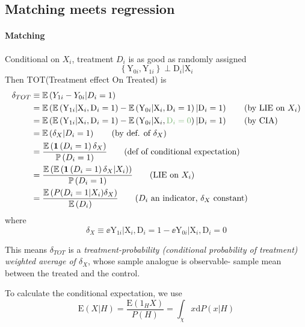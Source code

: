 \documentclass[11pt]{article}
\begin{document}
\subsection{Matching meets regression}
\paragraph*{Matching}
Conditional on $X_i$, treatment $D_i$ is as good as randomly assigned
\begin{equation}
   \left\{\mathrm{Y}_{0 i}, \mathrm{Y}_{1 i}\right\} \perp \mathrm{D}_{i} | \mathrm{X}_{i}
\end{equation}
Then TOT(Treatment effect On Treated) is
\begin{align*}
    \delta_{TOT}
    &\equiv \ee{Y_{1i}-Y_{0i}|D_i=1}\\
    &=\ee{\ee{\mathrm{Y}_{1 i} | \mathrm{X}_{i}, \mathrm{D}_{i}=1}-\ee{\mathrm{Y}_{0 i} | \mathrm{X}_{i}, \mathrm{D}_{i}=1} | \mathrm{D}_{i}=1}\tag{by LIE on $X_i$}\\
    &=\ee{\ee{\mathrm{Y}_{1 i} | \mathrm{X}_{i}, \mathrm{D}_{i}=1}-\ee{\mathrm{Y}_{0 i} | \mathrm{X}_{i}, \tcg{\mathrm{D}_{i}=0}} | \mathrm{D}_{i}=1}\tag{by CIA}\\
    &=\ee{\delta_X|D_i=1}\tag{by def. of $\delta_X$} \\
    &= \frac{\ee{\ind{D_i=1} \delta_X}}{\pp{D_i=1}} \tag{def of conditional expectation} \\
    &= \frac{\ee{\ee{\ind{D_i=1} \delta_X | X_i}}}{\pp{D_i=1}} \tag{LIE on $X_i$} \\ 
    &=\frac{\ee{P(D_i=1|X_i)\delta_X}}{\ee{D_i}} \tag{$D_i$ an indicator, $\delta_X$ constant}
\end{align*}
where 
$$
\delta_X\equiv\ee{\mathrm{Y}_{1i} | \mathrm{X}_{i}, \mathrm{D}_{i}=1}-\ee{\mathrm{Y}_{0i} | \mathrm{X}_{i}, \mathrm{D}_{i}=0}
$$
\begin{interpretation}
This means $\delta_{TOT}$ is a \emph{treatment-probability (conditional probability of treatment) weighted average of $\delta_X$}, whose sample analogue is observable- sample mean between the treated and the control.
\end{interpretation}

\begin{remark}
	To calculate the conditional expectation, we use
	\begin{equation}
		\mathrm{E}(X | H)=\frac{\mathrm{E}\left(1_{H} X\right)}{P(H)}=\int_{\chi} x \mathrm{d} P(x | H)
	\end{equation}
\end{remark}
\end{document}
